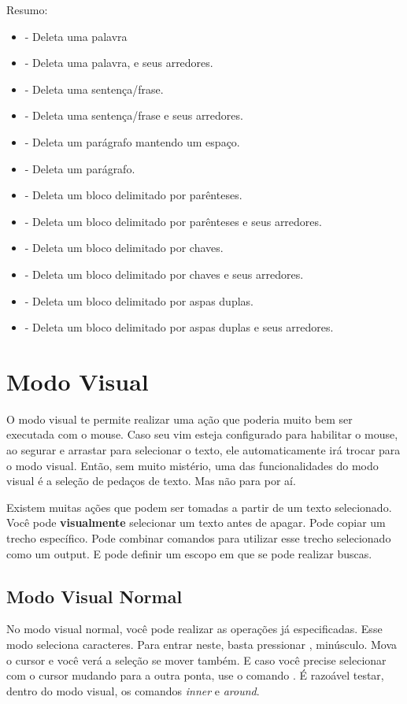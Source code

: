 Resumo:
\begin{itemize}
    \item {} - Deleta uma palavra
    \item {} - Deleta uma palavra, e seus arredores.
    \item {} - Deleta uma sentença/frase.
    \item {} - Deleta uma sentença/frase e seus arredores.
    \item {} - Deleta um parágrafo mantendo um espaço.
    \item {} - Deleta um parágrafo.
    \item {} - Deleta um bloco delimitado por parênteses.
    \item {} - Deleta um bloco delimitado por parênteses e seus arredores.
    \item {} - Deleta um bloco delimitado por chaves.
    \item {} - Deleta um bloco delimitado por chaves e seus arredores.
    \item {} - Deleta um bloco delimitado por aspas duplas.
    \item {} - Deleta um bloco delimitado por aspas duplas e seus arredores.
\end{itemize}

\section{Modo Visual}
O modo visual te permite realizar uma ação que poderia muito bem ser executada com o mouse.
Caso seu vim esteja configurado para habilitar o mouse, ao segurar e arrastar para selecionar o texto, ele automaticamente irá trocar para o modo visual.
Então, sem muito mistério, uma das funcionalidades do modo visual é a seleção de pedaços de texto. Mas não para por aí.

Existem muitas ações que podem ser tomadas a partir de um texto selecionado. Você pode \textbf{visualmente} selecionar um texto antes de apagar.
Pode copiar um trecho específico.
Pode combinar comandos para utilizar esse trecho selecionado como um output.
E pode definir um escopo em que se pode realizar buscas.

\subsection{Modo Visual Normal}
No modo visual normal, você pode realizar as operações já especificadas.
Esse modo seleciona caracteres.
Para entrar neste, basta pressionar , minúsculo.
Mova o cursor e você verá a seleção se mover também.
E caso você precise selecionar com o cursor mudando para a outra ponta, use o comando .
É razoável testar, dentro do modo visual, os comandos \emph{inner} e \emph{around}.

